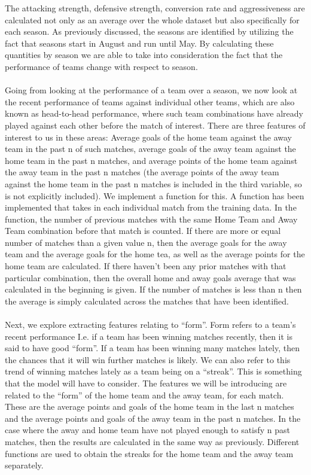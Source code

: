 \documentclass[a4paper,12pt]{article}
\begin{document}
	The attacking strength, defensive strength, conversion rate and aggressiveness are calculated not only as an average over the whole dataset but also specifically for each season. As previously discussed, the seasons are identified by utilizing the fact that seasons start in August and run until May. By calculating these quantities by season we are able to take into consideration the fact that the performance of teams change with respect to season. \\
	\\
	Going from looking at the performance of a team over a season, we now look at the recent performance of teams against individual other teams, which are also known as head-to-head performance, where such team combinations have already played against each other before the match of interest. There are three features of interest to us in these areas: Average goals of the home team against the away team in the past n of such matches, average goals of the away team against the home team in the past n matches, and average points of the home team against the away team in the past n matches (the average points of the away team against the home team in the past n matches is included in the third variable, so is not explicitly included). We implement a function for this. A function has been implemented that takes in each individual match from the training data. In the function, the number of previous matches with the same Home Team and Away Team combination before that match is counted. If there are more or equal number of matches than a given value n, then the average goals for the away team and the average goals for the home tea, as well as the average points for the home team are calculated. If there haven’t been any prior matches with that particular combination, then the overall home and away goals average that was calculated in the beginning is given.  If the number of matches is less than n then the average is simply calculated across the matches that have been identified.\\
	\\
	Next, we explore extracting features relating to “form”. Form refers to a team’s recent performance I.e. if a team has been winning matches recently, then it is said to have good “form”. If a team has been winning many matches lately, then the chances that it will win further matches is likely. We can also refer to this trend of winning matches lately as a team being on a “streak”. This is something that the model will have to consider. The features we will be introducing are related to the “form” of the home team and the away team, for each match. These are the average points and goals of the home team in the last n matches and the average points and goals of the away team in the past n matches. In the case where the away and home team have not played enough to satisfy n past matches, then the results are calculated in the same way as previously. Different functions are used to obtain the streaks for the home team and the away team separately.\\
\end{document}
